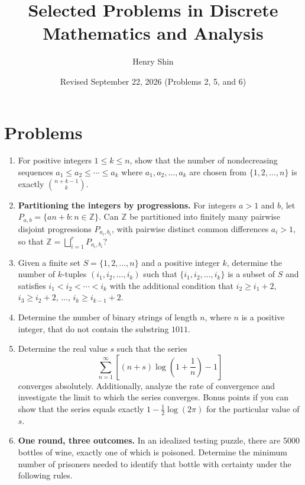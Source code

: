 \documentclass[12pt]{article}
\title{Selected Problems in Discrete Mathematics and Analysis}
\author{Henry Shin}
\date{\small Revised September 22, 2026 (Problems 2, 5, and 6)}
\begin{document}
\maketitle

\section*{Problems}

\begin{enumerate}

    \item For positive integers \(1 \leq k \leq n\), show that the number of nondecreasing sequences \(a_1 \leq a_2 \leq \cdots \leq a_k\) where \(a_1, a_2, \ldots, a_k\) are chosen from \(\{1, 2, \ldots, n\}\) is exactly \(\binom{n+k-1}{k}\).

    \item \textbf{Partitioning the integers by progressions.} For integers \(a>1\) and \(b\), let \(P_{a,b}=\{an+b:n\in\mathbb{Z}\}\). Can \(\mathbb{Z}\) be partitioned into finitely many pairwise disjoint progressions \(P_{a_i,b_i}\), with pairwise distinct common differences \(a_i>1\), so that \(\mathbb{Z}=\bigsqcup_{i=1}^{r}P_{a_i,b_i}\)?

    \item Given a finite set \( S = \{1, 2, \ldots, n\} \) and a positive integer \( k \), determine the number of \( k \)-tuples \( (i_1, i_2, \ldots, i_k) \) such that \( \{i_1, i_2, \ldots, i_k\} \) is a subset of \( S \) and satisfies \( i_1 < i_2 < \cdots < i_k \) with the additional condition that \( i_2 \geq i_1 + 2 \), \( i_3 \geq i_2 + 2 \), \(\ldots\), \( i_k \geq i_{k-1} + 2 \).

    \item Determine the number of binary strings of length \( n \), where \( n \) is a positive integer, that do not contain the substring \( 1011 \).

    \item Determine the real value \( s \) such that the series
\[
\sum_{n=1}^{\infty} \left[(n+s)\log\left(1 + \frac{1}{n}\right) - 1\right]
\]
converges absolutely. Additionally, analyze the rate of convergence and investigate the limit to which the series converges. Bonus points if you can show that the series equals exactly \( 1 - \frac{1}{2} \log(2\pi) \) for the particular value of \( s\).

    \item \textbf{One round, three outcomes.} In an idealized testing puzzle, there are 5000 bottles of wine, exactly one of which is poisoned. Determine the minimum number of prisoners needed to identify that bottle with certainty under the following rules.


\end{enumerate}
\end{document}
